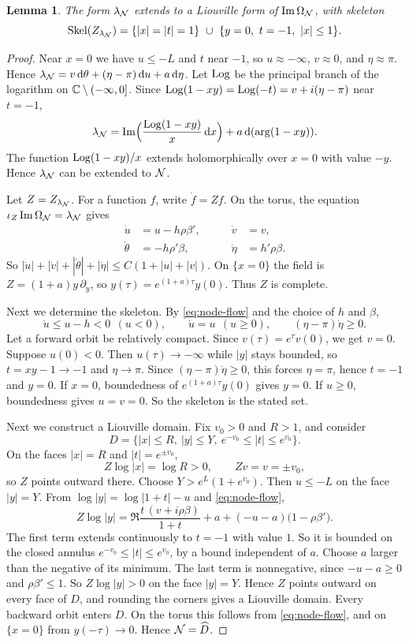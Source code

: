 \documentclass[12pt, letter]{amsart}
\newtheorem{lemma}[dummy]{Lemma}
\theoremstyle{definition}
\begin{document}
\begin{lemma}\label{lem:node}
The form \(\lambda_{\mathcal{N}}\) extends to a Liouville form of $\operatorname{Im}\Omega_{\mathcal{N}}$, with skeleton
\[
 \Skel(Z_{\lN})=\{|x|=|t|=1\}\ \cup\ \{y=0,\ t=-1,\ |x|\le1\} .
\]
\end{lemma}

\begin{proof}
Near $x=0$ we have $u\le-L$ and $t$ near $-1$, so \(u \approx -\infty\), \(v \approx 0\), and \( \eta\approx\pi\). Hence
$\lambda_{\mathcal{N}}=v\,\mathrm{d}\theta+(\eta-\pi)\,\mathrm{d} u+a\,\mathrm{d}\eta$.
Let $\operatorname{Log}$ be the principal branch of the logarithm on $\mathbb{C}\setminus(-\infty,0]$.
Since $\operatorname{Log}(1-xy)=\operatorname{Log}(-t)=v+i(\eta-\pi)$ near $t=-1$,
\[
 \lambda_{\mathcal{N}}=\operatorname{Im}\Bigl(\frac{\operatorname{Log}(1-xy)}{x}\,\mathrm{d} x\Bigr)+a\,\mathrm{d}(\arg(1-xy)).
\]
The function $\operatorname{Log}(1-xy)/x$ extends holomorphically over $x=0$ with value $-y$.
Hence \(\lambda_{\mathcal{N}}\) can be extended to \(\mathcal{N}\). 

Let \(Z = Z_{\lambda_{\mathcal{N}}}\). 
For a function $f$, write $\dot f=Z f$.
On the torus, the equation $\iota_{Z} \operatorname{Im}\Omega_{\mathcal{N}}=\lambda_{\mathcal{N}}$ gives
\begin{equation}\label{eq:node-flow}
 \begin{aligned}
 \dot u&=u-h\rho\beta',&\qquad \dot v&=v,\\
 \dot\theta&=-h\rho'\beta,&\qquad \dot\eta&=h'\rho\beta.
 \end{aligned}
\end{equation}
So $|\dot u|+|\dot v|+|\dot\theta|+|\dot \eta|\le C(1+|u|+|v|)$.
On $\{x=0\}$ the field is $Z=(1+a)y\,\partial_y$, so $y(\tau)=e^{(1+a)\tau}y(0)$.
Thus $Z$ is complete.

Next we determine the skeleton.
By \eqref{eq:node-flow} and the choice of $h$ and $\beta$,
\[
 \dot u\le u-h<0\ \ (u<0),\qquad\dot u=u\ \ (u\ge0),\qquad (\eta-\pi)\dot \eta\ge0 .
\]
Let a forward orbit be relatively compact.
Since $v(\tau)=e^\tau v(0)$, we get $v=0$.
Suppose $u(0)<0$.
Then $u(\tau)\to-\infty$ while $|y|$ stays bounded, so $t=xy-1\to-1$ and $\eta\to\pi$.
Since $(\eta-\pi)\dot \eta\ge0$, this forces $\eta=\pi$, hence $t=-1$ and $y=0$.
If $x=0$, boundedness of $e^{(1+a)\tau}y(0)$ gives $y=0$.
If $u\ge0$, boundedness gives $u=v=0$.
So the skeleton is the stated set.

Next we construct a Liouville domain.
Fix $v_0>0$ and $R>1$, and consider
\[
 D=\{|x|\le R,\ |y|\le Y,\ e^{-v_0}\le|t|\le e^{v_0}\} .
\]
On the faces $|x|=R$ and $|t|=e^{\pm v_0}$,
\[
 Z\log|x|=\log R>0,\qquad Zv=v=\pm v_0,
\]
so $Z$ points outward there.
Choose $Y>e^{L}(1+e^{v_0})$.
Then $u\le-L$ on the face $|y|=Y$.
From $\log|y|=\log|1+t|-u$ and \eqref{eq:node-flow},
\[
 Z\log|y|=\Re\frac{t\,(v+i\rho\beta)}{1+t}+a+(-u-a)\bigl(1-\rho\beta'\bigr) .
\]
The first term extends continuously to $t=-1$ with value $1$.
So it is bounded on the closed annulus $e^{-v_0}\le|t|\le e^{v_0}$, by a bound independent of $a$.
Choose $a$ larger than the negative of its minimum.
The last term is nonnegative, since $-u-a\ge0$ and $\rho\beta'\le1$.
So $Z\log|y|>0$ on the face $|y|=Y$.
Hence $Z$ points outward on every face of $D$, and rounding the corners gives a Liouville domain.
Every backward orbit enters $D$.
On the torus this follows from \eqref{eq:node-flow}, and on $\{x=0\}$ from $y(-\tau)\to0$.
Hence $\mathcal{N}=\widehat D$. \end{proof}
\end{document}
